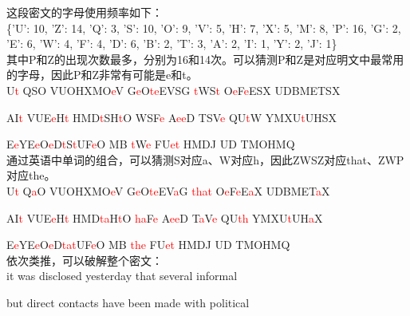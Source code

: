 这段密文的字母使用频率如下：\\

\{'U': 10, 'Z': 14, 'Q': 3, 'S': 10, 'O': 9, 'V': 5, 'H': 7, 'X': 5, 'M': 8, 'P': 16, 'G': 2, 'E': 6, 'W': 4, 'F': 4, 'D': 6, 'B': 2, 'T': 3, 'A': 2, 'I': 1, 'Y': 2, 'J': 1\}\\

其中P和Z的出现次数最多，分别为16和14次。可以猜测P和Z是对应明文中最常用的字母，因此P和Z非常有可能是e和t。\\

U\textcolor{red}{t} QSO VUOHXMO\textcolor{red}{e}V G\textcolor{red}{e}O\textcolor{red}{t}\textcolor{red}{e}EVSG \textcolor{red}{t}WS\textcolor{red}{t} O\textcolor{red}{e}F\textcolor{red}{e}ESX UDBMETSX

AI\textcolor{red}{t} VUE\textcolor{red}{e}H\textcolor{red}{t} HMD\textcolor{red}{t}SH\textcolor{red}{t}O WSF\textcolor{red}{e} A\textcolor{red}{ee}D TSV\textcolor{red}{e} QU\textcolor{red}{t}W YMXU\textcolor{red}{t}UHSX

E\textcolor{red}{e}YE\textcolor{red}{e}O\textcolor{red}{e}D\textcolor{red}{t}S\textcolor{red}{t}UF\textcolor{red}{e}O MB \textcolor{red}{t}W\textcolor{red}{e} FU\textcolor{red}{et} HMDJ UD TMOHMQ\\

通过英语中单词的组合，可以猜测S对应a、W对应h，因此ZWSZ对应that、ZWP对应the。\\

U\textcolor{red}{t} Q\textcolor{red}{a}O VUOHXMO\textcolor{red}{e}V G\textcolor{red}{e}O\textcolor{red}{t}\textcolor{red}{e}EV\textcolor{red}{a}G \textcolor{red}{that} O\textcolor{red}{e}F\textcolor{red}{e}E\textcolor{red}{a}X UDBMET\textcolor{red}{a}X

AI\textcolor{red}{t} VUE\textcolor{red}{e}H\textcolor{red}{t} HMD\textcolor{red}{ta}H\textcolor{red}{t}O \textcolor{red}{ha}F\textcolor{red}{e} A\textcolor{red}{ee}D T\textcolor{red}{a}V\textcolor{red}{e} QU\textcolor{red}{th} YMXU\textcolor{red}{t}UH\textcolor{red}{a}X

E\textcolor{red}{e}YE\textcolor{red}{e}O\textcolor{red}{e}D\textcolor{red}{ta}\textcolor{red}{t}UF\textcolor{red}{e}O MB \textcolor{red}{the} FU\textcolor{red}{et} HMDJ UD TMOHMQ\\

依次类推，可以破解整个密文：\\

it was disclosed yesterday that several informal

but direct contacts have been made with political


